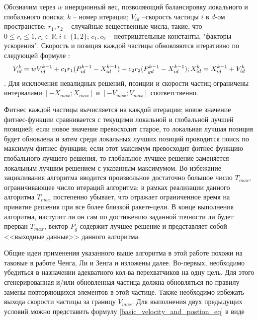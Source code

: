 Обозначим через $w$ инерционный вес, позволяющий балансировку локального и глобального поиска; $k$ -- номер итерации; $V_{id}$ --скорость частицы $i$ в  $d$-ом пространстве; $r_1, r_2$ -- случайные вещественные числа, такие, что $0 \le r_i \le 1, r_i \in \mathbb{R}, i \in \{1,2\}$; $c_1, c_2$ -- неотрицательные константы, "факторы ускорения".   Скорость и позиция каждой частицы обновляются итеративно по следующей формуле \cite[с. 519]{Cheng:2017}: 
\begin{equation} \label{basic_velocity_and_postion_eq}
	V_{id}^{k} = wV_{id}^{k-1}+c_1r_1(P_{id}^{k-1}-X_{id}^{k-1}) + c_2 r_2(P_{gd}^{k-1} - X_{id}^{k-1}); \\
	X_{id}^{k} = X_{id}^{k-1} + V_{id}^{k}
\end{equation}
 . Для исключения невалидных решений, позиции и скорости частиц ограничены интервалами $[-X_{max}; X_{max}]$ и $[-V_{max}; V_{max}]$ соответственно.

Фитнес каждой частицы вычисляется на каждой итерации; новое значение фитнес-функции сравнивается с текущими локальной и глобальной лучшей позицией; если новое значение превосходит старое, то локальная лучшая позиция будет обновлена и затем среди локальных лучших позиций проводится поиск по максимум фитнес функции; если этот максимум превосходит фитнес функцию глобального лучшего решения, то глобальное лучшее решение заменяется локальным лучшим решением с указанным максимумом. Во избежание зацикливания алгоритма вводится произвольное достаточно большое число $T_{max}$, ограничивающее число итераций алгоритма; в рамках реализации данного алгоритма $T_{max}$ постепенно убывает, что отражает ограниченное время на принятие решения при все более близкой ракете-цели. В конце выполнения алгоритма, наступит ли он сам по достижению заданной точности ли будет прерван $T_{max}$, вектор $P_g$ содержит лучшее решение и представляет собой <<выходные данные>> данного алгоритма.


Общие идеи применения указанного выше алгоритма в этой работе похожи на таковые в работе Ченга, Ли и Зенга \cite{Cheng:2017} и изложены далее. Во-первых, необходимо убедиться в  назначении адекватного кол-ва перехватчиков на одну цель. Для этого сгенерированная и/или обновленная частица должна обновляться по правилу замены повторяющихся элементов в этой частице. Также необходимо избежать выхода скорости частицы за границу $V_{max}$. Для выполнения двух предыдущих условий можно представить формулу \ref{basic_velocity_and_postion_eq} в виде \cite[с. 519]{Cheng:2017}

